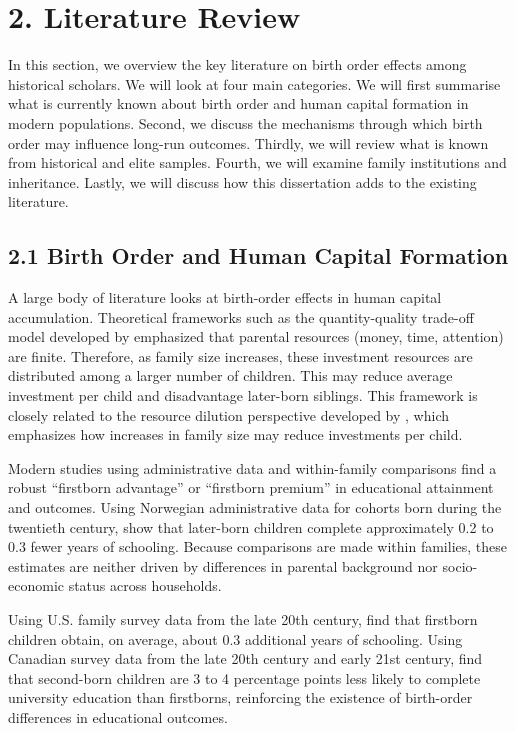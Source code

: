 \setcounter{section}{4}
\section*{2. Literature Review}

In this section, we overview the key literature on birth order effects among historical scholars. We will look at four main categories. We will first summarise what is currently known about birth order and human capital formation in modern populations. Second, we discuss the mechanisms through which birth order may influence long-run outcomes. Thirdly, we will review what is known from historical and elite samples. Fourth, we will examine family institutions and inheritance. Lastly, we will discuss how this dissertation adds to the existing literature.

\subsection*{2.1 Birth Order and Human Capital Formation}

A large body of literature looks at birth-order effects in human capital accumulation. Theoretical frameworks such as the quantity-quality trade-off model developed by \cite{Becker1976} emphasized that parental resources (money, time, attention) are finite. Therefore, as family size increases, these investment resources are distributed among a larger number of children. This may reduce average investment per child and disadvantage later-born siblings. This framework is closely related to the resource dilution perspective developed by \cite{Blake1981}, which emphasizes how increases in family size may reduce investments per child.

Modern studies using administrative data and within-family comparisons find a robust ``firstborn advantage'' or ``firstborn premium'' in educational attainment and outcomes. Using Norwegian administrative data for cohorts born during the twentieth century, \cite{Black2005} show that later-born children complete approximately 0.2 to 0.3 fewer years of schooling. Because comparisons are made within families, these estimates are neither driven by differences in parental background nor socio-economic status across households.

Using U.S. family survey data from the late 20th century, \cite{Behrman1986} find that firstborn children obtain, on average, about 0.3 additional years of schooling. Using Canadian survey data from the late 20th century and early 21st century, \cite{Kantarevic2006} find that second-born children are 3 to 4 percentage points less likely to complete university education than firstborns, reinforcing the existence of birth-order differences in educational outcomes.

